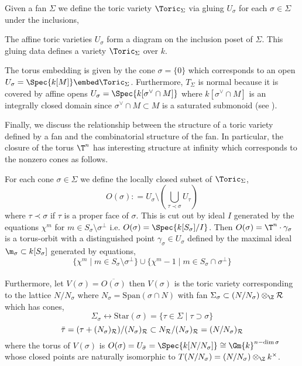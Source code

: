 \begin{definition}
Given a fan $\Sigma$ we define the toric variety $\Toric_\Sigma$ via gluing $U_\sigma$ for each $\sigma \in \Sigma$ under the inclusions,
\begin{center}
\end{center}
The affine toric varieties $U_{\sigma}$ form a diagram on the inclusion poset of $\Sigma$. This gluing data defines a variety $\Toric_\Sigma$ over $k$.
\end{definition}

\begin{rmk}
The torus embedding is given by the cone $\sigma = \{ 0 \}$ which corresponds to an open $U_\sigma = \Spec{k[M]} \embed \Toric_\Sigma$. Furthermore, $T_\Sigma$ is normal because it is covered by affine opens $U_{\sigma} = \Spec{k[\sigma^\vee \cap M]}$ where $k[\sigma^\vee \cap M]$ is an integrally closed domain since $\sigma^\vee \cap M \subset M$ is a saturated submonoid (see \cite[Thm. 1.14 + Ex. 1.11]{cox_lectures}).
\end{rmk}

\noindent
Finally, we discuss the relationship between the structure of a toric variety defined by a fan and the combinatorial structure of the fan. In particular, the closure of the torus $\T^n$ has interesting structure at infinity which corresponds to the nonzero cones as follows.

\begin{prop}
For each cone $\sigma \in \Sigma$ we define the locally closed subset of $\Toric_\Sigma$,
\[ O(\sigma) : = U_\sigma \setminus \left( \bigcup_{\tau \prec \sigma} U_\tau \right) \]
where $\tau \prec \sigma$ if $\tau$ is a proper face of $\sigma$. This is cut out by ideal $I$ generated by the equations $\chi^m $ for $m \in S_\sigma \setminus \sigma^\perp$ i.e. $O(\sigma) = \Spec{k[S_\sigma]/I}$. Then $O(\sigma) = \T^n \cdot \gamma_\sigma$ is a torus-orbit with a distinguished point $\gamma_\sigma \in U_\sigma$ defined by the maximal ideal $\m_\sigma \subset k[S_\sigma]$ generated by equations,
 \[ \{ \chi^m \mid m \in S_\sigma \setminus \sigma^\perp \} \cup \{ \chi^m - 1 \mid m \in S_\sigma \cap \sigma^\perp \}  \]
\bigskip\\
Furthermore, let $V(\sigma) = \overline{O(\sigma)}$ then $V(\sigma)$ is the toric variety corresponding to the lattice $N / N_\sigma$ where $N_\sigma = \mathrm{Span}(\sigma \cap N)$ with fan $\Sigma_\sigma \subset (N/N_\sigma) \otimes_\Z \R$ which has cones,
\[ \Sigma_\sigma \leftrightarrow \mathrm{Star}(\sigma) = \{ \tau \in \Sigma \mid \tau \supset \sigma \} \]
\[ \bar{\tau} = (\tau + (N_\sigma)_{\mathcal{R}})/ (N_\sigma)_{\mathcal{R}} \subset N_{\mathcal{R}} / (N_\sigma)_{\mathcal{R}} = (N/ N_\sigma)_{\mathcal{R}} \]
where the torus of $V(\sigma)$ is $O(\sigma) = U_{\bar{\sigma}} = \Spec{k[N/N_\sigma]} \cong \Gm{k}^{n - \dim{\sigma}}$ whose closed points are naturally isomorphic to $T(N/N_\sigma) = (N / N_\sigma) \otimes_\Z k^\times$. 
\end{prop}

